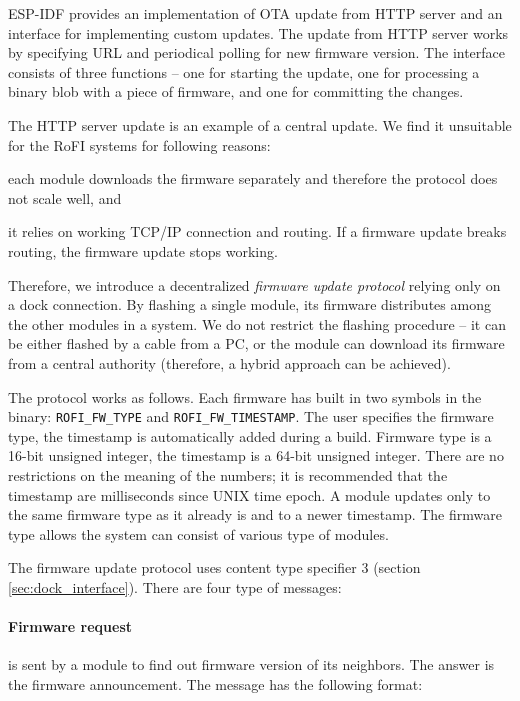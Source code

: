 ESP-IDF provides an implementation of OTA update from HTTP server and an
interface for implementing custom updates. The update from HTTP server works by
specifying URL and periodical polling for new firmware version. The interface
consists of three functions -- one for starting the update, one for processing a
binary blob with a piece of firmware, and one for committing the changes.

The HTTP server update is an example of a central update. We find it unsuitable
for the RoFI systems for following reasons:
\begin{enumerate*}
    \item each module downloads the firmware separately and therefore the
    protocol does not scale well, and
    \item it relies on working TCP/IP connection and routing. If a firmware
    update breaks routing, the firmware update stops working.
\end{enumerate*}
Therefore, we introduce a decentralized \emph{firmware update protocol} relying
only on a dock connection. By flashing a single module, its firmware distributes
among the other modules in a system. We do not restrict the flashing procedure
-- it can be either flashed by a cable from a PC, or the module can download its
firmware from a central authority (therefore, a hybrid approach can be
achieved).

The protocol works as follows. Each firmware has built in two symbols in the
binary: \texttt{ROFI\_FW\_TYPE} and \texttt{ROFI\_FW\_TIMESTAMP}. The user
specifies the firmware type, the timestamp is automatically added during a
build. Firmware type is a 16-bit unsigned integer, the timestamp is a 64-bit
unsigned integer. There are no restrictions on the meaning of the numbers; it is
recommended that the timestamp are milliseconds since UNIX time epoch. A module
updates only to the same firmware type as it already is and to a newer
timestamp. The firmware type allows the system can consist of various type of
modules.

The firmware update protocol uses content type specifier 3 (section
\ref{sec:dock_interface}). There are four type of messages:

\paragraph{Firmware request} is sent by a module to find out firmware version of
its neighbors. The answer is the firmware announcement. The message has the
following format:

